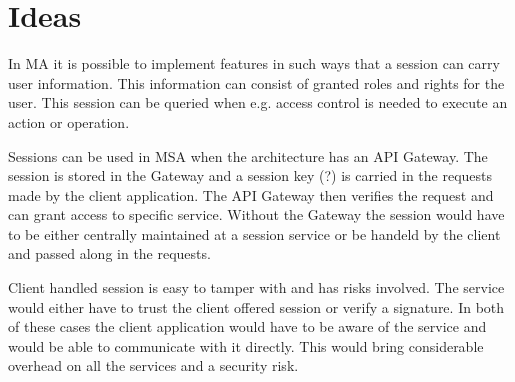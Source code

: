 

\section{Ideas}
\begin{sloppypar}
    In MA it is possible to implement features in such ways that a session can 
    carry user information. This information can consist of granted roles and 
    rights for the user. This session can be queried when e.g. access control 
    is needed to execute an action or operation.
\end{sloppypar}
\begin{sloppypar}
    Sessions can be used in MSA when the architecture has an API Gateway. The 
    session is stored in the Gateway and a session key (?) is carried in the 
    requests made by the client application. The API Gateway then verifies the
    request and can grant access to specific service. Without the Gateway the
    session would have to be either centrally maintained at a session service 
    or be handeld by the client and passed along in the requests.
\end{sloppypar}
\begin{sloppypar}
    Client handled session is easy to tamper with and has risks involved. The 
    service would either have to trust the client offered session or verify a 
    signature. In both of these cases the client application would have to be 
    aware of the service and would be able to communicate with it directly. 
    This would bring considerable overhead on all the services and a security 
    risk.
\end{sloppypar}

